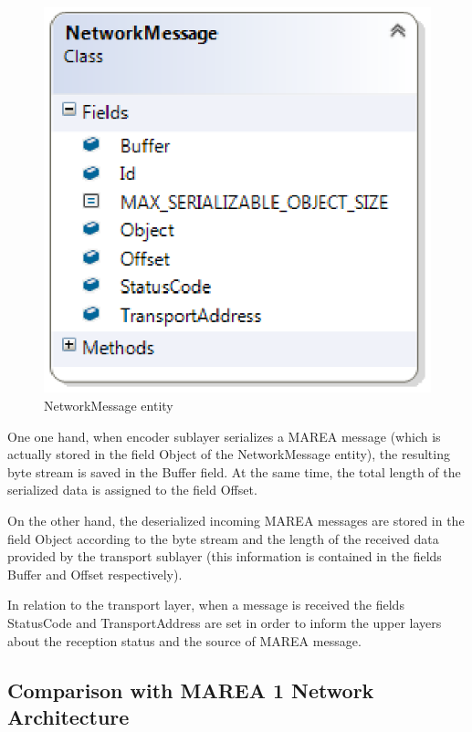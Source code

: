 \begin{figure}[H]\begin{center}
 \centering
  \captionsetup{justification=centering}
  \includegraphics[scale=0.75]{pictures/network/NetworkMessage}
  \caption{NetworkMessage entity \label{fig:network-message}}
\end{center}\end{figure}

One one hand, when encoder sublayer serializes a MAREA message (which is actually stored in the field Object of the NetworkMessage entity), the resulting byte stream is saved in the Buffer field. At the same time, the total length of the serialized data is assigned to the field Offset.

On the other hand, the deserialized incoming MAREA messages are stored in the field Object according to the byte stream and the length of the received data provided by the transport sublayer (this information is contained in the fields Buffer and Offset respectively). 

In relation to the transport layer, when a message is received the fields StatusCode and TransportAddress are set in order to inform the upper layers about the reception status and the source of MAREA message.

\subsection{Comparison with MAREA 1 Network Architecture}\label{SS:Comparison-with-MAREA-1-Network-Architecture}

